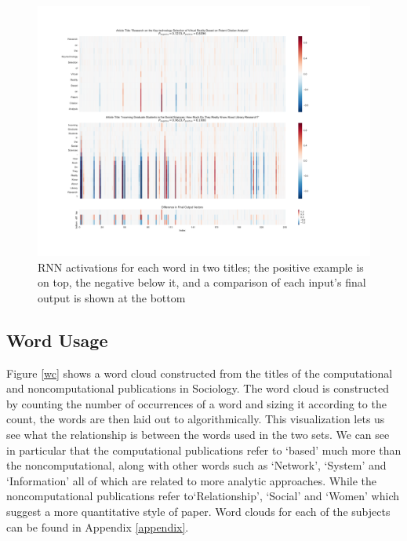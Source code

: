 \documentclass[12pt, a4paper]{article}
\begin{document}
\begin{figure}[H]
	\centering
		\includegraphics[width=\textwidth]{visualize}
	\caption{RNN activations for each word in two titles; the positive example is on top, the negative below it, and a comparison of each input's final output is shown at the bottom}\label{visualize}
\end{figure}

\subsection{Word Usage}\label{word_count}

Figure \ref{wc} shows a word cloud constructed from the titles of the computational and noncomputational publications in Sociology. The word cloud is constructed by counting the number of occurrences of a word and sizing it according to the count, the words are then laid out to algorithmically. This visualization lets us see what the relationship is between the words used in the two sets. We can see in particular that the computational publications refer to `based' much more than the noncomputational, along with other words such as `Network', `System' and `Information' all of which are related to more analytic approaches. While the noncomputational publications refer to`Relationship', `Social' and `Women' which suggest a more quantitative style of paper. Word clouds for each of the subjects can be found in Appendix \ref{appendix}.
\end{document}
